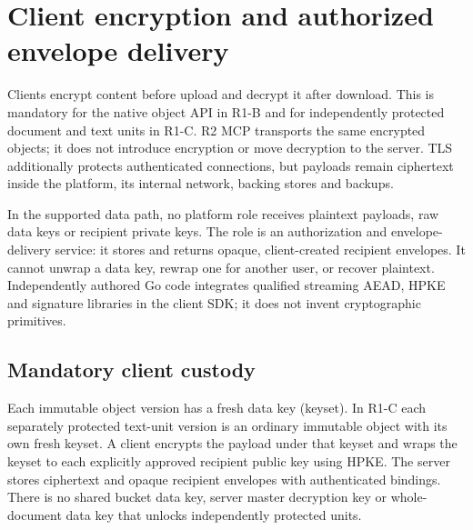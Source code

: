 \section{Client encryption and authorized envelope delivery}\label{sec:custody}
Clients encrypt content before upload and decrypt it after download. This is mandatory for the native object API in R1-B and for independently protected document and text units in R1-C. R2 MCP transports the same encrypted objects; it does not introduce encryption or move decryption to the server. TLS additionally protects authenticated connections, but payloads remain ciphertext inside the platform, its internal network, backing stores and backups.

In the supported data path, no platform role receives plaintext payloads, raw data keys or recipient private keys. The  role is an authorization and envelope-delivery service: it stores and returns opaque, client-created recipient envelopes. It cannot unwrap a data key, rewrap one for another user, or recover plaintext. Independently authored Go code integrates qualified streaming AEAD, HPKE and signature libraries in the client SDK; it does not invent cryptographic primitives.

\subsection{Mandatory client custody}
Each immutable object version has a fresh data key (keyset). In R1-C each separately protected text-unit version is an ordinary immutable object with its own fresh keyset. A client encrypts the payload under that keyset and wraps the keyset to each explicitly approved recipient public key using HPKE. The server stores ciphertext and opaque recipient envelopes with authenticated bindings. There is no shared bucket data key, server master decryption key or whole-document data key that unlocks independently protected units.

